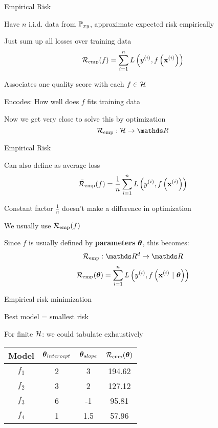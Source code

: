 \documentclass[11pt,compress,t,notes=noshow, xcolor=table]{beamer}
\begin{document}
\begin{framei}{Empirical Risk}
\item Have $n$ i.i.d. data from $\mathbb{P}_{xy}$, approximate expected risk empirically
\item Just sum up all losses over training data
$$
\mathcal{R}_{\text{emp}}(f) = \sum\limits_{i=1}^n L\left(y^{(i)}, f\left(\mathbf{x}^{(i)}\right)\right)
$$
\item Associates one quality score with each $f \in \mathcal{H}$
\item Encodes: How well does $f$ fits training data
\item Now we get very close to solve this by optimization 
$$
\riske: \Hspace \to \R
$$
\end{framei}


\begin{framei}{Empirical Risk}
\item Can also define as average loss
$$
\bar{\mathcal{R}}_{\text{emp}}(f) = \frac{1}{n}\sum\limits_{i=1}^n L\left(y^{(i)}, f\left(\mathbf{x}^{(i)}\right)\right)
$$
\item Constant factor $\frac{1}{n}$ doesn't make a difference in optimization
\item We usually use $\mathcal{R}_{\text{emp}}(f)$ 
\item Since $f$ is usually defined by \textbf{parameters} $\bm{\theta}$, this becomes:
$$
\riske : \R^d \to \R
$$
$$
\mathcal{R}_{\text{emp}}(\bm{\theta}) = \sum\limits_{i=1}^n L\left(y^{(i)}, f\left(\mathbf{x}^{(i)} ~|~ \bm{\theta}\right)\right)
$$
\end{framei}


\begin{framei}{Empirical risk minimization}
\item Best model = smallest risk
\item For finite $\mathcal{H}$: we could tabulate exhaustively
\vfill
\begin{center}
\begin{tabular}{ c | c | c || c } %
Model & \(\displaystyle \bm{\theta}_{intercept} \) & \(\displaystyle \bm{\theta}_{slope} \) & \(\displaystyle \mathcal{R}_{\text{emp}}(\bm{\theta}) \) \\ 
\hline
\(\displaystyle f_1 \)   & 2 & 3 & 194.62 \\
\(\displaystyle f_2 \)   & 3 & 2 & 127.12 \\  
\(\displaystyle f_3 \)   & 6 & -1 & 95.81 \\
\rowcolor{lightgray}
\(\displaystyle f_4 \)   & 1 & 1.5 & 57.96 \\  
\end{tabular}
\end{center}
\end{framei}
\end{document}
